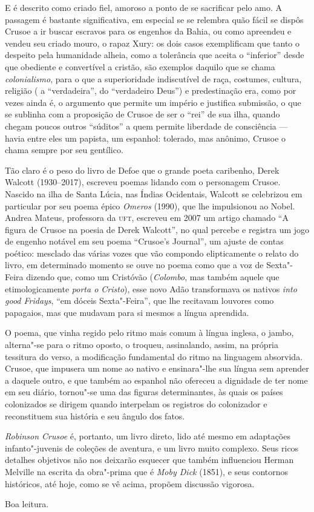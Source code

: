 E é descrito como criado fiel, amoroso a ponto de se sacrificar pelo
amo. A passagem é bastante significativa, em especial se se relembra
quão fácil se dispôs Crusoe a ir buscar escravos para os engenhos da
Bahia, ou como apreendeu e vendeu seu criado mouro, o rapaz Xury: os
dois casos exemplificam que tanto o despeito pela humanidade alheia,
como a tolerância que aceita o ``inferior'' desde que obediente e
convertível a cristão, são exemplos daquilo que se chama
\emph{colonialismo}, para o que a superioridade indiscutível de raça,
costumes, cultura, religião ( a ``verdadeira'', do ``verdadeiro Deus'')
e predestinação era, como por vezes ainda é, o argumento que permite um
império e justifica submissão, o que se sublinha com a proposição de
Crusoe de ser o ``rei'' de sua ilha, quando chegam poucos outros
``súditos'' a quem permite liberdade de consciência --- havia entre eles
um papista, um espanhol: tolerado, mas anônimo, Crusoe o chama sempre
por seu gentílico.

Tão claro é o peso do livro de Defoe que o grande poeta caribenho, Derek
Walcott (1930--2017), escreveu poemas lidando com o personagem Crusoe.
Nascido na ilha de Santa Lúcia, nas Índias Ocidentais, Walcott se
celebrizou em particular por seu poema épico \emph{Omeros} (1990), que
lhe impulsionou ao Nobel. Andrea Mateus, professora da \textsc{uft}, escreveu em
2007 um artigo chamado ``A figura de Crusoe na poesia de Derek
Walcott'', no qual percebe e registra um jogo de engenho notável em seu
poema ``Crusoe's Journal'', um ajuste de contas poético: mesclado das
várias vozes que vão compondo elipticamente o relato do livro, em
determinado momento se ouve no poema como que a voz de Sexta"-Feira
dizendo que, como um Cristóvão (\emph{Colombo}, mas também aquele que
etimologicamente \emph{porta o Cristo}), esse novo Adão transformava os
nativos \emph{into good Fridays}, ``em dóceis Sexta"-Feira'', que lhe
recitavam louvores como papagaios, mas que mudavam para si mesmos a
língua aprendida.

O poema, que vinha regido pelo ritmo mais comum à língua inglesa, o
jambo, alterna"-se para o ritmo oposto, o troqueu, assinalando, assim, na
própria tessitura do verso, a modificação fundamental do ritmo na
linguagem absorvida. Crusoe, que impusera um nome ao nativo e
ensinara"-lhe sua língua sem aprender a daquele outro, e que também ao
espanhol não ofereceu a dignidade de ter nome em seu diário, tornou"-se
uma das figuras determinantes, às quais os países colonizados se dirigem
quando interpelam os registros do colonizador e reconstituem sua
história e seu ângulo dos fatos.

\emph{Robinson Crusoe} é, portanto, um livro direto, lido até mesmo em
adaptações infanto"-juvenis de coleções de aventura, e um livro muito
complexo. Seus ricos detalhes objetivos não nos deixarão esquecer que
também influenciou Herman Melville na escrita da obra"-prima que é
\emph{Moby Dick} (1851), e seus contornos históricos, até hoje, como se
vê acima, propõem discussão vigorosa.

\medskip

\hfill{}Boa leitura.
